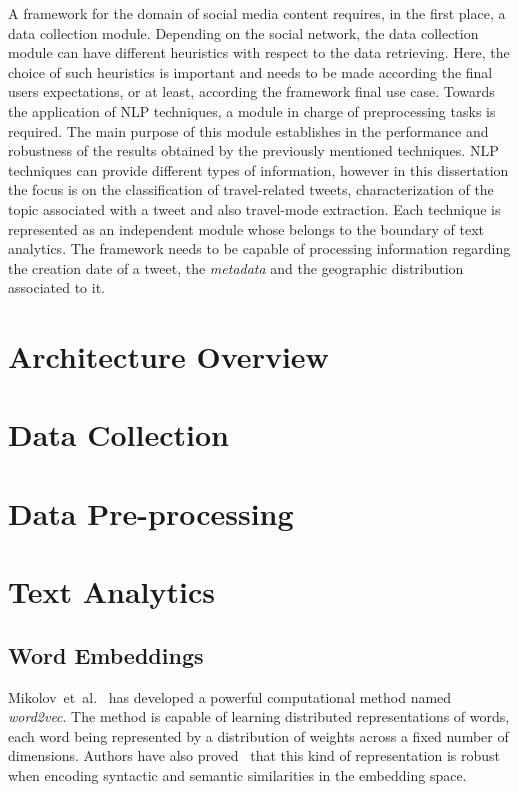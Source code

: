 A framework for the domain of social media content requires, in the first place, a data collection module. Depending on the social network, the data collection module can have different heuristics with respect to the data retrieving. Here, the choice of such heuristics is important and needs to be made according the final users expectations, or at least, according the framework final use case. Towards the application of NLP techniques, a module in charge of preprocessing tasks is required. The main purpose of this module establishes in the performance and robustness of the results obtained by the previously mentioned techniques. NLP techniques can provide different types of information, however in this dissertation the focus is on the classification of travel-related tweets, characterization of the topic associated with a tweet and also travel-mode extraction. Each technique is represented as an independent module whose belongs to the boundary of text analytics. The framework needs to be capable of processing information regarding the creation date of a tweet, the \textit{metadata} and the geographic distribution associated to it.

\section{Architecture Overview}\label{sec:architecture}

\section{Data Collection}\label{sec:data_collection}



\section{Data Pre-processing}\label{sec:data_preprocessing}

\section{Text Analytics}\label{sec:text_analytics}

\subsection{Word Embeddings}
Mikolov~et~al.~\cite{mikolov2013efficient} has developed a powerful computational method named \emph{word2vec}. The method is capable of learning distributed representations of words, each word being represented by a distribution of weights across a fixed number of dimensions. Authors have also proved~\cite{mikolov2013linguistic} that this kind of representation is robust when encoding syntactic and semantic similarities in the embedding space.

